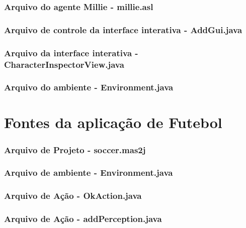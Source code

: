 \subsection*{Arquivo do agente Millie - millie.asl}


\subsection*{Arquivo de controle da interface interativa - AddGui.java}


\subsection*{Arquivo da interface interativa - CharacterInspectorView.java}


\subsection*{Arquivo do ambiente - Environment.java}

\chapter{Fontes da aplicação de Futebol}

\subsection*{Arquivo de Projeto - soccer.mas2j} \label{adps}


\subsection*{Arquivo de ambiente - Environment.java}


\subsection*{Arquivo de Ação - OkAction.java}


\subsection*{Arquivo de Ação - addPerception.java}


